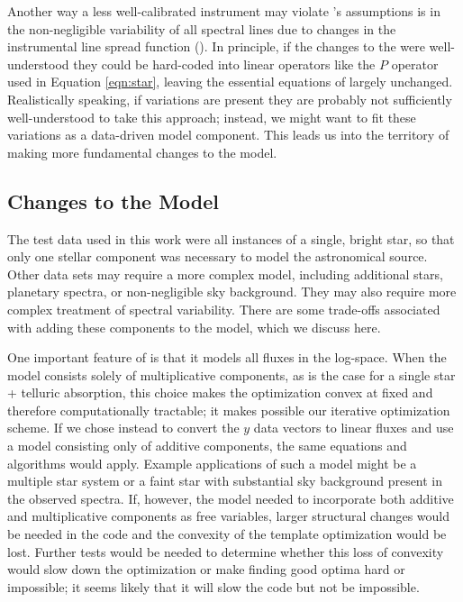 \documentclass[twocolumn]{aastex62}
\begin{document}
Another way a less well-calibrated instrument may violate \wobble's assumptions is in the non-negligible variability of all spectral lines due to changes in the instrumental line spread function (\LSF). 
In principle, if the changes to the \LSF were well-understood they could be hard-coded into linear operators like the $P$ operator used in Equation \ref{eqn:star}, leaving the essential equations of \wobble largely unchanged. 
Realistically speaking, if \LSF variations are present they are probably not sufficiently well-understood to take this approach; instead, we might want to fit these variations as a data-driven model component. 
This leads us into the territory of making more fundamental changes to the \wobble model.

\subsection{Changes to the Model}
\label{s:model-changes}
 
The test data used in this work were all instances of a single, bright star, so that only one stellar component was necessary to model the astronomical source. 
Other data sets may require a more complex model, including additional stars, planetary spectra, or non-negligible sky background. 
They may also require more complex treatment of spectral variability. 
There are some trade-offs associated with adding these components to the model, which we discuss here.

One important feature of \wobble is that it models all fluxes in the log-space. 
When the model consists solely of multiplicative components, as is the case for a single star + telluric absorption, this choice makes the optimization convex at fixed \RV and therefore computationally tractable; it makes possible our iterative optimization scheme.
If we chose instead to convert the $y$ data vectors to linear fluxes and use a model consisting only of additive components, the same equations and algorithms would apply.
Example applications of such a model might be a multiple star system or a faint star with substantial sky background present in the observed spectra. 
If, however, the model needed to incorporate both additive and multiplicative
components as free variables, larger structural changes would be needed in the code and the convexity of the template optimization would be lost. 
Further tests would be needed to determine whether this loss of convexity would slow down the optimization or make finding good optima hard or impossible; it seems likely that it will slow the code but not be impossible.
\end{document}
